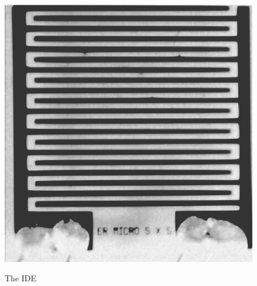 \documentclass[12pt,oneside,english]{article}
\begin{document}
\begin{figure}
\includegraphics[scale=0.4]{images/IDE.eps} \label{f:IDE}
\caption{The IDE}
\end{figure}
	


\clearpage


\end{document}
